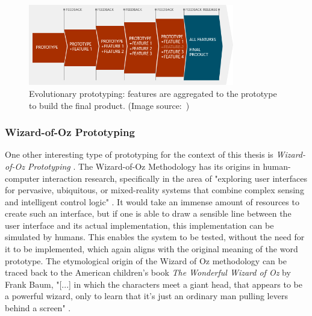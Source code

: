\begin{figure}
    \centering
    \includegraphics[width=0.8\textwidth]{images/evolutionary-prototyping}
    \caption{Evolutionary prototyping: features are aggregated to the prototype to build the final product. (Image source:~\cite{mourzenko_why_2014})}
    \label{fig:evolutionary-prototyping}
\end{figure}

\subsubsection{Wizard-of-Oz Prototyping}
\label{subsub:wizard-of-oz-prototyping}
One other interesting type of prototyping for the context of this thesis is \emph{Wizard-of-Oz Prototyping} \cite{dow_wizard_2005}.
The Wizard-of-Oz Methodology has its origins in human-computer interaction research, specifically in the area of "exploring user interfaces for pervasive, ubiquitous,
or mixed-reality systems that combine complex sensing and intelligent control logic" \cite{dow_wizard_2005}.
It would take an immense amount of resources to create such an interface, but if one is able to draw a sensible line between the user interface and its actual implementation, this implementation can be simulated by humans.
This enables the system to be tested, without the need for it to be implemented, which again aligns with the original meaning of the word prototype.
The etymological origin of the Wizard of Oz methodology can be traced back to the American children's book \emph{The Wonderful Wizard of Oz} by Frank Baum, "[...] in which the characters meet a giant head, that appears to be a powerful wizard, only to learn that it’s just an ordinary man pulling levers behind a screen" \cite{ramaswamy_wizard_2022}.



